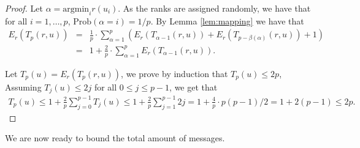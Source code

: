 \documentclass[11pt]{article}
\newcommand{\argmin}{\mathrm{argmin}}
\theoremstyle{plain}
\theoremstyle{definition}
\theoremstyle{remark}
\numberwithin{equation}{section}
\begin{document}
\begin{proof}

Let $\alpha=\argmin_i r(u_i)$. As the ranks are assigned randomly,
we have that for all $i=1, \ldots, p$, $\mbox{Prob}(\alpha=i) = 1/
p$. By Lemma \ref{lem:mapping} we have that
\begin{eqnarray*} E_r(T_p(r,u)) &=& \frac{1}{p}\cdot \sum_{\alpha=1}^p \left( E_r(T_{\alpha-1}(r,u)) + E_r(T_{p-\beta(\alpha)}(r,u)) + 1\right) \\
&=& 1 + \frac{2}{p} \cdot \sum_{\alpha=1}^p E_r(T_{\alpha-1}(r,u)). \end{eqnarray*}





Let $T_p(u) = E_r(T_p(r,u))$, we prove by induction that $T_p(u) \leq 2p$, Assuming $T_{j}(u) \leq 2j$ for all $0 \leq j \leq p-1$, we get that
\vspace*{-6pt}
    \begin{eqnarray*}
    T_p(u) \leq 1 +  \frac{2}{p}\sum_{j=0}^{p-1} T_j(u)
      \leq 1 + \frac{2}{p} \sum_{j=1}^{p-1} 2j
      = 1 + \frac{4}{p} \cdot p(p-1)/2
      = 1 +  2(p-1) \leq 2p.
    \end{eqnarray*}
\vspace*{-10pt}
 \end{proof}

We are now ready to bound the total amount of messages.
\end{document}
